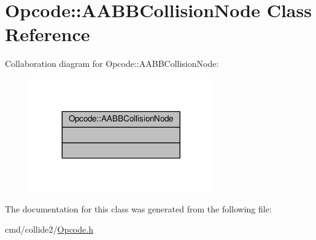 \hypertarget{classOpcode_1_1AABBCollisionNode}{}\section{Opcode\+:\+:A\+A\+B\+B\+Collision\+Node Class Reference}
\label{classOpcode_1_1AABBCollisionNode}


Collaboration diagram for Opcode\+:\+:A\+A\+B\+B\+Collision\+Node\+:
\nopagebreak
\begin{figure}[H]
\begin{center}
\leavevmode
\includegraphics[width=224pt]{d2/ded/classOpcode_1_1AABBCollisionNode__coll__graph}
\end{center}
\end{figure}


The documentation for this class was generated from the following file\+:\begin{DoxyCompactItemize}
\item 
cmd/collide2/\hyperlink{Opcode_8h}{Opcode.\+h}\end{DoxyCompactItemize}
